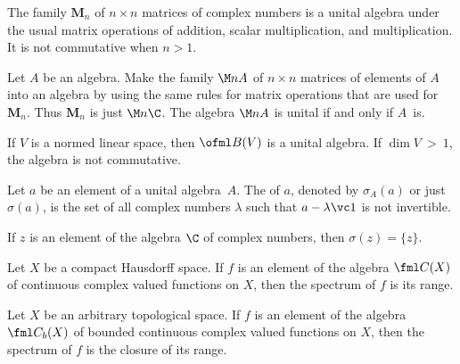 \begin{exam}\label{000533} The family
$\mathbf M_n$ of $n \times n$ matrices of complex numbers is a
unital algebra under the usual matrix operations of addition, scalar multiplication, and
multiplication. It is not commutative when $n > 1$.
\end{exam}

\begin{exam}\label{000533a} Let $A$ be an algebra. Make the family
$\M n{A}$ of $n \times n$ matrices of elements of $A$ into an
algebra by using the same rules for matrix operations that are used for~$\mathbf M_n$.
Thus $\mathbf M_n$ is just $\M n\C$. The algebra $\M nA$ is unital if and only if $A$~is.
\end{exam}

\begin{exam}\label{000534} If $V$ is a normed linear space, then
$\ofml B(V)$ is a unital algebra.  If $\dim V~>~1$, the algebra is not commutative.
\end{exam}

\begin{defn}\label{000535} Let $a$ be an element of a unital algebra~$A$.  The
 of $a$, denoted by
$\sigma_A(a)$ or just $\sigma(a)$, is the set of all complex numbers $\lambda$ such that
$a - \lambda\vc 1$ is not invertible.
\end{defn}

\begin{exam} If $z$ is an element of the algebra $\C$ of complex numbers, then
$\sigma(z) = \{z\}$.
\end{exam}

\begin{exam}\label{0005712} Let $X$ be a compact Hausdorff space.  If $f$ is an element
of the algebra $\fml C(X)$ of continuous complex valued functions on $X$, then the
spectrum of $f$ is its range.
\end{exam}

\begin{exam} Let $X$ be an arbitrary topological space.  If $f$ is an element of the
algebra $\fml C_b(X)$ of bounded continuous complex valued functions on $X$, then the
spectrum of $f$ is the closure of its range.
\end{exam}

